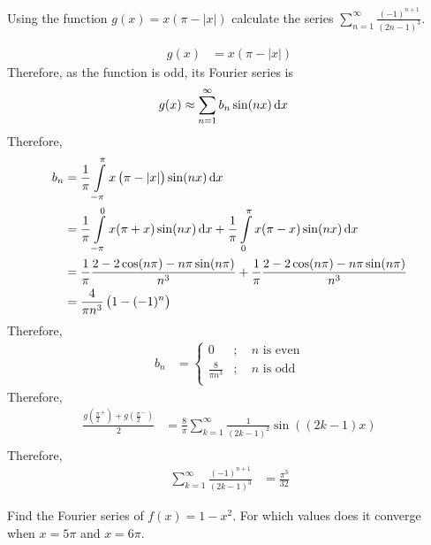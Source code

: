 \documentclass[fleqn, a4paper, 11pt, oneside]{amsart}
\theoremstyle{definition}
\theoremstyle{theorem}
\begin{document}
\begin{question}
	Using the function $g(x) = x \left( \pi - |x| \right)$ calculate the series $\sum\limits_{n = 1}^{\infty} \frac{(-1)^{n + 1}}{(2 n - 1)^3}$.
\end{question}

\begin{solution}
	\begin{align*}
		g(x) & = x \left( \pi - |x| \right)
	\end{align*}
	Therefore, as the function is odd, its Fourier series is
	\begin{align*}
		g(x) & \approx \sum\limits_{n = 1}^{\infty} b_n \sin(n x) \dif x
	\end{align*}
	Therefore,
	\begin{align*}
		b_n & = \frac{1}{\pi} \int\limits_{-\pi}^{\pi} x \left( \pi - |x| \right) \sin(n x) \dif x                                                   \\
                    & = \frac{1}{\pi} \int\limits_{-\pi}^{0} x (\pi + x) \sin(n x) \dif x + \frac{1}{\pi} \int\limits_{0}^{\pi} x (\pi - x) \sin(n x) \dif x \\
                    & = \frac{1}{\pi} \frac{2 - 2 \cos(n \pi) - n \pi \sin(n \pi)}{n^3} + \frac{1}{\pi} \frac{2 - 2 \cos(n \pi) - n \pi \sin(n \pi)}{n^3}    \\
                    & = \frac{4}{\pi n^3} \left( 1 - (-1)^n \right)
	\end{align*}
	Therefore,
	\begin{align*}
		b_n &=
			\begin{cases}
				0                 & ;\quad n \text{ is even} \\
				\frac{8}{\pi n^3} & ;\quad n \text{ is odd}  \\
			\end{cases}
	\end{align*}
	Therefore,
	\begin{align*}
		\frac{g\left( {\frac{\pi}{2}}^+ \right) + g\left( {\frac{\pi}{2}}^- \right)}{2} & = \frac{8}{\pi} \sum\limits_{k = 1}^{\infty} \frac{1}{(2 k - 1)^2} \sin\left( (2 k - 1) x \right) \\
	\end{align*}
	Therefore,
	\begin{align*}
		\sum\limits_{k = 1}^{\infty} \frac{(-1)^{n + 1}}{(2 k - 1)^3} & = \frac{\pi^3}{32}
	\end{align*}
\end{solution}

\begin{question}
	Find the Fourier series of $f(x) = 1 - x^2$.
	For which values does it converge when $x = 5 \pi$ and $x = 6 \pi$.
\end{question}
\end{document}
